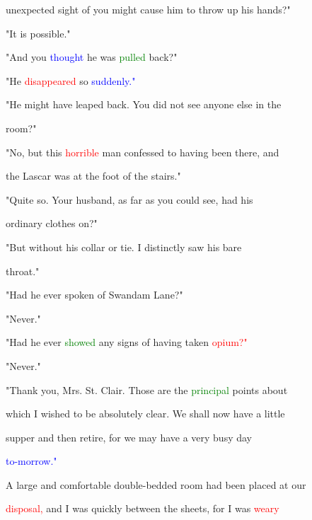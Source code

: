  \textcolor{BurntOrange}{unexpected} sight of you might cause him to throw up his hands?"



 "It is possible."



 "And you \textcolor{blue}{thought} he was \textcolor{green}{pulled} back?"



 "He \textcolor{red}{disappeared} so \textcolor{blue}{suddenly."}



 "He might have leaped back. You did not see anyone else in the

 room?"



 "No, but this \textcolor{red}{horrible} man \textcolor{BurntOrange}{confessed} to having been there, and

 the Lascar was at the foot of the stairs."



 "Quite so. Your husband, as far as you could see, had his

 ordinary clothes on?"



 "But without his collar or tie. I distinctly saw his bare

 throat."



 "Had he ever spoken of Swandam Lane?"



 "Never."



 "Had he ever \textcolor{green}{showed} any signs of having taken \textcolor{red}{opium?"}



 "Never."



 "Thank you, Mrs. St. Clair. Those are the \textcolor{green}{principal} points about

 which I wished to be absolutely clear. We shall now have a little

 supper and then retire, for we may have a very busy day

 \textcolor{blue}{to-morrow."}



 A large and comfortable double-bedded room had been placed at our

 \textcolor{red}{disposal,} and I was quickly between the sheets, for I was \textcolor{red}{weary}

